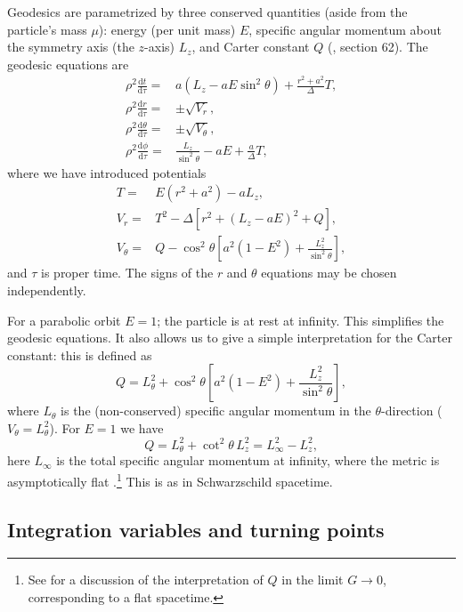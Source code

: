 \documentclass[useAMS,usedcolumn,usegraphicx,usenatbib]{mn2e}
\newcommand{\dd}{\ensuremath{\mathrm{d}}}
\newcommand{\diff}[2]{\ensuremath{\frac{\dd {#1}}{\dd {#2}}}}
\begin{document}
Geodesics are parametrized by three conserved quantities (aside from the particle's mass $\mu$): energy (per unit mass) $E$, specific angular momentum about the symmetry axis (the $z$-axis) $L_z$, and Carter constant $Q$ (\citealt{Carter1968, Chandrasekhar1998}, section 62). The geodesic equations are
\begin{align}
\rho^2 \diff{t}{\tau} = {} & a\left(L_z - aE\sin^2 \theta\right) + \frac{r^2 + a^2}{\Delta}T,\\
\rho^2 \diff{r}{\tau} = {} & \pm \sqrt{V_r},\\
\rho^2 \diff{\theta}{\tau} = {} & \pm \sqrt{V_\theta},\\
\rho^2 \diff{\phi}{\tau} = {} & \frac{L_z}{\sin^2 \theta} - aE + \frac{a}{\Delta}T,
\end{align}
where we have introduced potentials
\begin{align}
T = {} & E\left(r^2 +a^2\right) - aL_z,\\
V_r = {} & T^2 - \Delta\left[r^2 + \left(L_z -aE\right)^2 + Q\right],\\
V_\theta = {} & Q - \cos^2 \theta\left[a^2\left(1 - E^2\right) + \frac{L_z^2}{\sin^2\theta}\right],
\end{align}
and $\tau$ is proper time. The signs of the $r$ and $\theta$ equations may be chosen independently.

For a parabolic orbit $E = 1$; the particle is at rest at infinity. This simplifies the geodesic equations. It also allows us to give a simple interpretation for the Carter constant: this is defined as
\begin{equation}
Q = L_\theta^2 + \cos^2\theta\left[a^2\left(1 - E^2\right) + \frac{L_z^2}{\sin^2\theta}\right],
\end{equation}
where $L_\theta$ is the (non-conserved) specific angular momentum in the $\theta$-direction ($V_\theta = L_\theta^2$). For $E = 1$ we have
\begin{equation}
Q = L_\theta^2 + \cot^2\theta\, L_z^2 = L_\infty^2 - L_z^2,
\end{equation}
here $L_\infty$ is the total specific angular momentum at infinity, where the metric is asymptotically flat \citep{DeFelice1980}.\footnote{See \citet*{Rosquist2009} for a discussion of the interpretation of $Q$ in the limit $G \rightarrow 0$, corresponding to a flat spacetime.} This is as in Schwarzschild spacetime.

\subsection{Integration variables and turning points}
\end{document}
